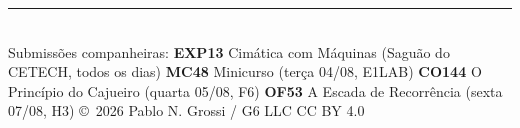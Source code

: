 \documentclass[final]{article}
\newcommand{\Small}{\fontsize{22}{29}\selectfont}
\begin{document}
\vspace{9mm}
{\color{rule}\rule{\linewidth}{1.5pt}}\\[3mm]
{\Small\color{ink!70}
Submissões companheiras: \textbf{EXP13} Cimática com Máquinas (Saguão do CETECH, todos os dias)
\;\textbullet\; \textbf{MC48} Minicurso (terça 04/08, E1LAB)
\;\textbullet\; \textbf{CO144} O Princípio do Cajueiro (quarta 05/08, F6)
\;\textbullet\; \textbf{OF53} A Escada de Recorrência (sexta 07/08, H3)
\hfill \copyright\ 2026 Pablo N. Grossi / G6 LLC \;\textbullet\; CC BY 4.0}
\end{document}

